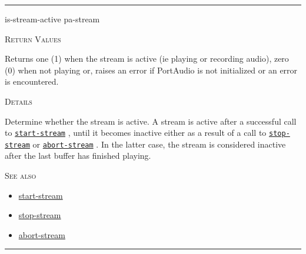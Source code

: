 \documentclass[a4paper]{report}
\begin{document}
  

    \rule{\linewidth}{0.1mm}
    
    \label{portaudio__fun__is-stream-active}
    \begin{defun}[Function]
    is-stream-active pa-stream


    
    \bigskip
    \textsc{Return Values}


Returns one (1) when the stream is active (ie playing or recording audio), zero (0) when not playing or, raises an error if PortAudio is not initialized or an error is encountered.


	
    \bigskip
    \textsc{Details}

Determine whether the stream is active. A stream is active after a successful call to \hyperref[portaudio__fun__start-stream]{\texttt{start-stream}}
  , until it becomes inactive either as a result of a call to \hyperref[portaudio__fun__stop-stream]{\texttt{stop-stream}}
   or \hyperref[portaudio__fun__abort-stream]{\texttt{abort-stream}}
  . In the latter case, the stream is considered inactive after the last buffer has finished playing.




      
    \bigskip
    \textsc{See also}


	
    \begin{itemize}
    
	  
    \item
    \hyperref[portaudio__fun__start-stream]{start-stream}
    
    \item
    \hyperref[portaudio__fun__stop-stream]{stop-stream}
    
    \item
    \hyperref[portaudio__fun__abort-stream]{abort-stream}
    
	
    \end{itemize}
  
      


    
    \end{defun}
  
  

    \rule{\linewidth}{0.1mm}
    
\end{document}
